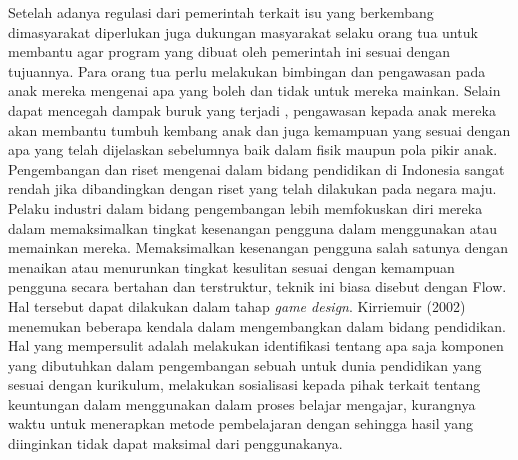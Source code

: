 Setelah adanya regulasi dari pemerintah terkait isu yang berkembang dimasyarakat diperlukan juga dukungan masyarakat selaku orang tua untuk membantu agar program yang dibuat oleh pemerintah ini sesuai dengan tujuannya. Para orang tua perlu melakukan bimbingan dan pengawasan pada anak mereka mengenai \game apa yang boleh dan tidak untuk mereka mainkan. Selain dapat mencegah dampak buruk yang terjadi , pengawasan kepada anak mereka akan membantu tumbuh kembang anak dan juga kemampuan yang sesuai dengan apa yang telah dijelaskan sebelumnya baik dalam fisik maupun pola pikir anak.
\linebreak\linebreak
Pengembangan dan riset mengenai \game dalam bidang pendidikan di Indonesia sangat rendah jika dibandingkan dengan riset yang telah dilakukan pada negara maju. Pelaku industri dalam bidang pengembangan \game lebih memfokuskan diri mereka dalam memaksimalkan tingkat kesenangan pengguna dalam menggunakan atau memainkan \game mereka. Memaksimalkan kesenangan pengguna salah satunya dengan menaikan atau menurunkan tingkat kesulitan sesuai dengan kemampuan pengguna secara bertahan dan terstruktur, teknik ini biasa disebut dengan Flow. Hal tersebut dapat dilakukan dalam tahap \textit{game design}.
\linebreak\linebreak
Kirriemuir (2002) menemukan beberapa kendala dalam mengembangkan \game dalam bidang pendidikan. Hal yang mempersulit adalah melakukan identifikasi tentang apa saja komponen yang dibutuhkan dalam pengembangan sebuah \game untuk dunia pendidikan yang sesuai dengan kurikulum, melakukan sosialisasi kepada pihak terkait tentang keuntungan dalam menggunakan \game dalam proses belajar mengajar, kurangnya waktu untuk menerapkan metode pembelajaran dengan \game sehingga hasil yang diinginkan tidak dapat maksimal dari penggunakanya.
\linebreak\linebreak



